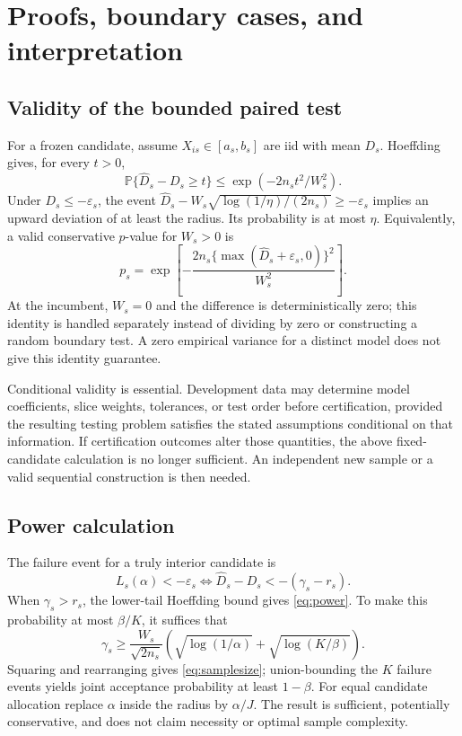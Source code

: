 \documentclass[11pt,letterpaper]{article}
\newcommand{\Prb}{\mathbb{P}}
\newcommand{\eps}{\varepsilon}
\begin{document}
\begingroup
\small
\setlength{\bibsep}{4pt}
\raggedright


\endgroup

\clearpage
\appendix
\section{Proofs, boundary cases, and interpretation}
\label{app:proofs}
\subsection{Validity of the bounded paired test}
For a frozen candidate, assume $X_{is}\in[a_s,b_s]$ are iid with mean $D_s$. Hoeffding gives, for every $t>0$,
\begin{equation}
\Prb\{\widehat D_s-D_s\geq t\}\leq
\exp(-2n_st^2/W_s^2).
\end{equation}
Under $D_s\leq-\eps_s$, the event
$\widehat D_s-W_s\sqrt{\log(1/\eta)/(2n_s)}\geq-\eps_s$
implies an upward deviation of at least the radius. Its probability is at most $\eta$. Equivalently, a valid conservative $p$-value for $W_s>0$ is
\begin{equation}
p_s=\exp\left[-\frac{2n_s\{\max(\widehat D_s+\eps_s,0)\}^2}{W_s^2}\right].
\end{equation}
At the incumbent, $W_s=0$ and the difference is deterministically zero; this identity is handled separately instead of dividing by zero or constructing a random boundary test. A zero empirical variance for a distinct model does not give this identity guarantee.

Conditional validity is essential. Development data may determine model coefficients, slice weights, tolerances, or test order before certification, provided the resulting testing problem satisfies the stated assumptions conditional on that information. If certification outcomes alter those quantities, the above fixed-candidate calculation is no longer sufficient. An independent new sample or a valid sequential construction is then needed.

\subsection{Power calculation}
The failure event for a truly interior candidate is
\[
L_s(\alpha)<-\eps_s
\iff\widehat D_s-D_s<-(\gamma_s-r_s).
\]
When $\gamma_s>r_s$, the lower-tail Hoeffding bound gives \eqref{eq:power}. To make this probability at most $\beta/K$, it suffices that
\[
\gamma_s\geq\frac{W_s}{\sqrt{2n_s}}
\left(\sqrt{\log(1/\alpha)}+\sqrt{\log(K/\beta)}\right).
\]
Squaring and rearranging gives \eqref{eq:samplesize}; union-bounding the $K$ failure events yields joint acceptance probability at least $1-\beta$. For equal candidate allocation replace $\alpha$ inside the radius by $\alpha/J$. The result is sufficient, potentially conservative, and does not claim necessity or optimal sample complexity.
\end{document}
